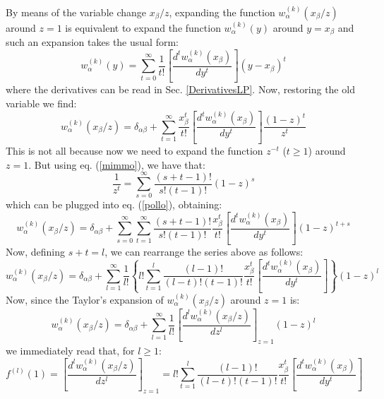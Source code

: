 \documentclass[10pt,a4paper]{article}
\begin{document}
By means of the variable change $x_\beta/z$, expanding the function $w_{\alpha}^{(k)}(x_\beta/z)$ around $z=1$ is
equivalent to expand the function $w_{\alpha}^{(k)}(y)$ around
$y=x_\beta$ and such an expansion takes the usual form:
\begin{equation}
w_{\alpha}^{(k)}(y) = \sum_{t=0}^\infty \frac{1}{t!} \left[\frac{d^t
  w_\alpha^{(k)}(x_\beta)}{dy^t}\right] (y-x_\beta)^t
\end{equation}
where the derivatives can be read in Sec. \ref{DerivativesLP}. Now,
restoring the old variable we find:
\begin{equation}\label{pollo}
w_{\alpha}^{(k)}(x_\beta/z) = \delta_{\alpha\beta}+\sum_{t=1}^\infty \frac{x_\beta^t}{t!} \left[\frac{d^t
  w_\alpha^{(k)}(x_\beta)}{dy^t}\right] \frac{(1-z)^t}{z^t}
\end{equation}
This is not all because now we need to expand the function $z^{-t}$
($t \geq 1$) around $z=1$. But using eq. (\ref{mimmo}), we have that:
\begin{equation}
\frac{1}{z^t}=\sum_{s=0}^{\infty}\frac{(s+t-1)!}{s!(t-1)!}(1-z)^s
\end{equation}
which can be plugged into eq. (\ref{pollo}), obtaining:
\begin{equation}\label{pollo1}
w_{\alpha}^{(k)}(x_\beta/z) = \delta_{\alpha\beta}+\sum_{s=0}^{\infty}\sum_{t=1}^\infty \frac{(s+t-1)!}{s!(t-1)!}\frac{x_\beta^t}{t!} \left[\frac{d^t
  w_\alpha^{(k)}(x_\beta)}{dy^t}\right] (1-z)^{t+s}
\end{equation}
Now, defining $s+t=l$, we can rearrange the series above as follows:
\begin{equation}\label{pollo2}
w_{\alpha}^{(k)}(x_\beta/z) = \delta_{\alpha\beta}+\sum_{l=1}^{\infty}\frac1{l!}\left\{l!\sum_{t=1}^l \frac{(l-1)!}{(l-t)!(t-1)!}\frac{x_\beta^t}{t!} \left[\frac{d^t
  w_\alpha^{(k)}(x_\beta)}{dy^t}\right] \right\}(1-z)^l
\end{equation}
Now, since the Taylor's expansion of $w_{\alpha}^{(k)}(x_\beta/z)$
around $z=1$ is:
\begin{equation}\label{pollo3}
w_{\alpha}^{(k)}(x_\beta/z) = \delta_{\alpha\beta}+\sum_{l=1}^{\infty}\frac1{l!}\left[\frac{d^l
  w_\alpha^{(k)}(x_\beta/z)}{dz^l}\right]_{z=1} (1-z)^l
\end{equation}
we immediately read that, for $l\geq 1$:
\begin{equation}\label{pollo4}
f^{(l)}(1)=\left[\frac{d^l w_\alpha^{(k)}(x_\beta/z)}{dz^l}\right]_{z=1} = l!\sum_{t=1}^l \frac{(l-1)!}{(l-t)!(t-1)!}\frac{x_\beta^t}{t!} \left[\frac{d^t
  w_\alpha^{(k)}(x_\beta)}{dy^t}\right]
\end{equation}
\end{document}
